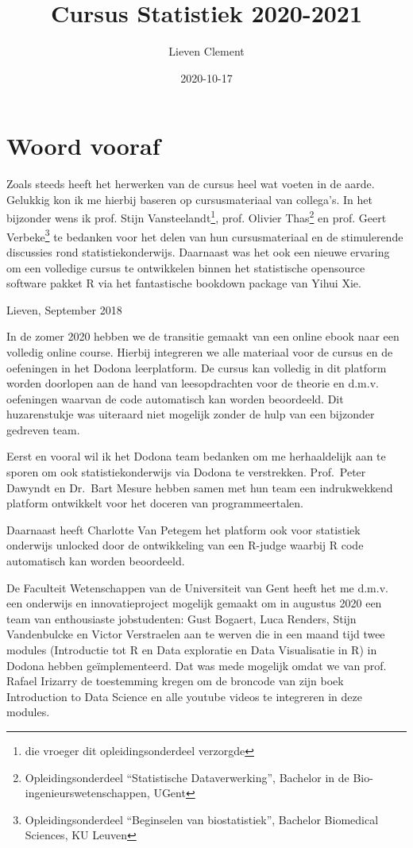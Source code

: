 \documentclass[
  12pt,dutch,coursenotes]{book}
\title{Cursus Statistiek 2020-2021}
\author{Lieven Clement}
\date{2020-10-17}
\theoremstyle{definition}
\theoremstyle{definition}
\theoremstyle{definition}
\theoremstyle{remark}
\begin{document}
\maketitle

{
\setcounter{tocdepth}{1}
\tableofcontents
}
\hypertarget{woord-vooraf}{%
\chapter*{Woord vooraf}\label{woord-vooraf}}

Zoals steeds heeft het herwerken van de cursus heel wat voeten in de aarde. Gelukkig kon ik me hierbij baseren op cursusmateriaal van collega's. In het bijzonder wens ik prof. Stijn Vansteelandt\footnote{die vroeger dit opleidingsonderdeel verzorgde}, prof. Olivier Thas\footnote{Opleidingsonderdeel ``Statistische Dataverwerking'', Bachelor in de Bio-ingenieurswetenschappen, UGent} en prof. Geert Verbeke\footnote{Opleidingsonderdeel ``Beginselen van biostatistiek'', Bachelor Biomedical Sciences, KU Leuven} te bedanken voor het delen van hun cursusmateriaal en de stimulerende discussies rond statistiekonderwijs. Daarnaast was het ook een nieuwe ervaring om een volledige cursus te ontwikkelen binnen het statistische opensource software pakket R via het fantastische bookdown package van Yihui Xie.

Lieven, September 2018

In de zomer 2020 hebben we de transitie gemaakt van een online ebook naar een volledig online course.
Hierbij integreren we alle materiaal voor de cursus en de oefeningen in het Dodona leerplatform.
De cursus kan volledig in dit platform worden doorlopen aan de hand van leesopdrachten voor de theorie en d.m.v. oefeningen waarvan de code automatisch kan worden beoordeeld.
Dit huzarenstukje was uiteraard niet mogelijk zonder de hulp van een bijzonder gedreven team.

Eerst en vooral wil ik het Dodona team bedanken om me herhaaldelijk aan te sporen om ook statistiekonderwijs via Dodona te verstrekken. Prof.~Peter Dawyndt en Dr.~Bart Mesure hebben samen met hun team een indrukwekkend platform ontwikkelt voor het doceren van programmeertalen.

Daarnaast heeft Charlotte Van Petegem het platform ook voor statistiek onderwijs unlocked door de ontwikkeling van een R-judge waarbij R code automatisch kan worden beoordeeld.

De Faculteit Wetenschappen van de Universiteit van Gent heeft het me d.m.v. een onderwijs en innovatieproject mogelijk gemaakt om in augustus 2020 een team van enthousiaste jobstudenten: Gust Bogaert, Luca Renders, Stijn Vandenbulcke en Victor Verstraelen aan te werven die in een maand tijd twee modules (Introductie tot R en Data exploratie en Data Visualisatie in R) in Dodona hebben geïmplementeerd. Dat was mede mogelijk omdat we van prof. Rafael Irizarry de toestemming kregen om de broncode van zijn boek Introduction to Data Science en alle youtube videos te integreren in deze modules.
\end{document}
